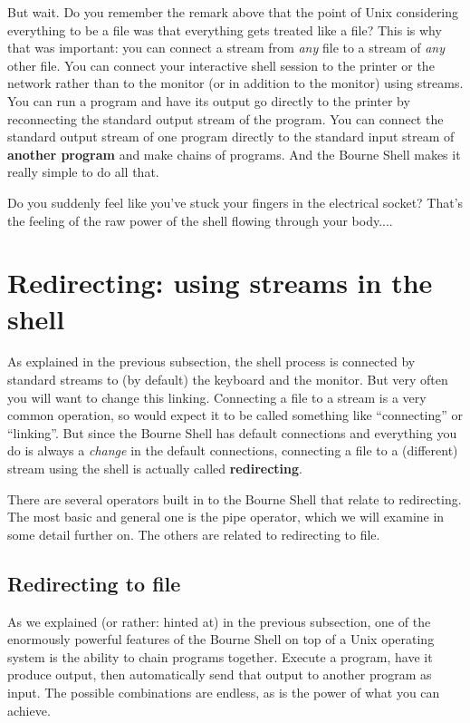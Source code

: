 But wait. Do you remember the remark above that the point of Unix considering
everything to be a file was that everything gets treated like a file? This is
why that was important: you can connect a stream from \emph{any} file to a
stream of \emph{any} other file. You can connect your interactive shell session
to the printer or the network rather than to the monitor (or in addition to the
monitor) using streams. You can run a program and have its output go directly
to the printer by reconnecting the standard output stream of the program. You
can connect the standard output stream of one program directly to the standard
input stream of \textbf{another program} and make chains of programs. And the
Bourne Shell makes it really simple to do all that.

Do you suddenly feel like you've stuck your fingers in the electrical socket?
That's the feeling of the raw power of the shell flowing through your body....

\section{Redirecting: using streams in the shell}
As explained in the previous subsection, the shell process is connected by
standard streams to (by default) the keyboard and the monitor. But very often
you will want to change this linking. Connecting a file to a stream is a very
common operation, so would expect it to be called something like ``connecting''
or ``linking''. But since the Bourne Shell has default connections and
everything you do is always a \emph{change} in the default connections,
connecting a file to a (different) stream using the shell is actually called
\textbf{redirecting}.

There are several operators built in to the Bourne Shell that relate to
redirecting. The most basic and general one is the pipe operator, which we will
examine in some detail further on. The others are related to redirecting to
file.

\subsection{Redirecting to file}
As we explained (or rather: hinted at) in the previous subsection, one of the
enormously powerful features of the Bourne Shell on top of a Unix operating
system is the ability to chain programs together. Execute a program, have it
produce output, then automatically send that output to another program as
input. The possible combinations are endless, as is the power of what you can
achieve.

